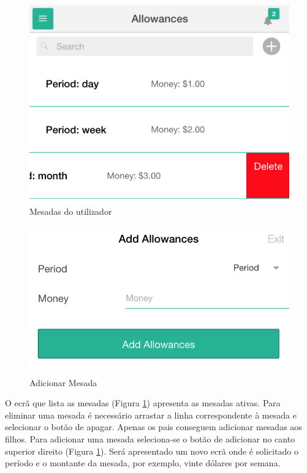 \begin{figure}[H]
	\begin{center}
		\includegraphics[width=0.5
		\textwidth]{allowances/allowances.png}
	\end{center}
	\caption{Mesadas do utilizador}
	\label{fig:3}
\end{figure}

\begin{figure}[H]
	\begin{center}
		\includegraphics[width=0.5
		\textwidth]{allowances/addAllowances.png}
	\end{center}
	\caption{Adicionar Mesada}
	\label{fig:3_1}
\end{figure}

O ecrã que lista as mesadas (Figura \ref{fig:3}) apresenta as mesadas ativas. Para eliminar uma mesada é necessário arrastar a linha correspondente à mesada e selecionar o botão de apagar. Apenas os pais conseguem adicionar mesadas aos filhos. Para adicionar uma mesada seleciona-se o botão de adicionar no canto superior direito (Figura \ref{fig:3}). Será apresentado um novo ecrã onde é solicitado o período e o montante da mesada, por exemplo, vinte dólares por semana.